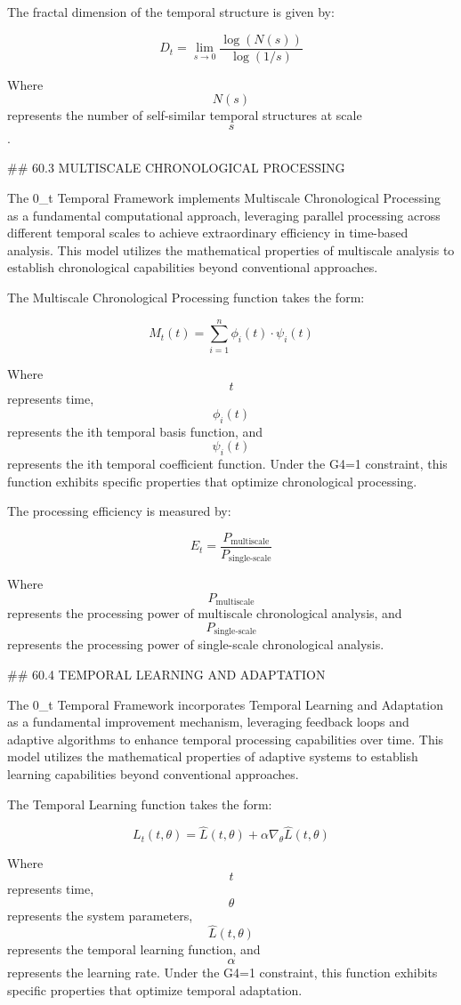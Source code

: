The fractal dimension of the temporal structure is given by:

$$ D_t = \lim_{s \to 0} \frac{\log(N(s))}{\log(1/s)} $$

Where $$ N(s) $$ represents the number of self-similar temporal structures at scale $$ s $$.

## 60.3 MULTISCALE CHRONOLOGICAL PROCESSING

The 0_t Temporal Framework implements Multiscale Chronological Processing as a fundamental computational approach, leveraging parallel processing across different temporal scales to achieve extraordinary efficiency in time-based analysis. This model utilizes the mathematical properties of multiscale analysis to establish chronological capabilities beyond conventional approaches.

The Multiscale Chronological Processing function takes the form:

$$ M_t(t) = \sum_{i=1}^{n} \phi_i(t) \cdot \psi_i(t) $$

Where $$ t $$ represents time, $$ \phi_i(t) $$ represents the ith temporal basis function, and $$ \psi_i(t) $$ represents the ith temporal coefficient function. Under the G4=1 constraint, this function exhibits specific properties that optimize chronological processing.

The processing efficiency is measured by:

$$ E_t = \frac{P_{\text{multiscale}}}{P_{\text{single-scale}}} $$

Where $$ P_{\text{multiscale}} $$ represents the processing power of multiscale chronological analysis, and $$ P_{\text{single-scale}} $$ represents the processing power of single-scale chronological analysis.

## 60.4 TEMPORAL LEARNING AND ADAPTATION

The 0_t Temporal Framework incorporates Temporal Learning and Adaptation as a fundamental improvement mechanism, leveraging feedback loops and adaptive algorithms to enhance temporal processing capabilities over time. This model utilizes the mathematical properties of adaptive systems to establish learning capabilities beyond conventional approaches.

The Temporal Learning function takes the form:

$$ L_t(t, \theta) = \hat{L}(t, \theta) + \alpha \nabla_{\theta} \hat{L}(t, \theta) $$

Where $$ t $$ represents time, $$ \theta $$ represents the system parameters, $$ \hat{L}(t, \theta) $$ represents the temporal learning function, and $$ \alpha $$ represents the learning rate. Under the G4=1 constraint, this function exhibits specific properties that optimize temporal adaptation.

